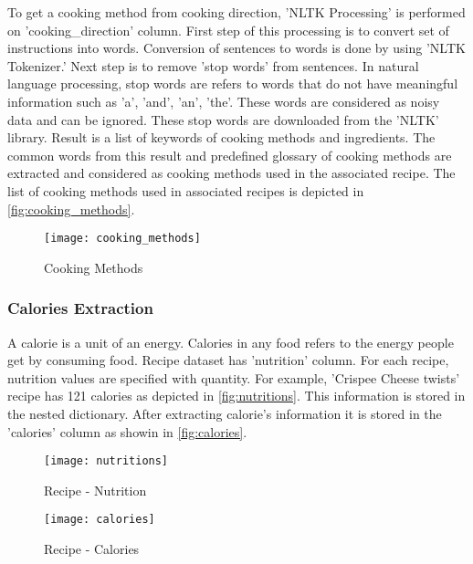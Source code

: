 \noindent To get a cooking method from cooking direction, 'NLTK Processing' is performed on 'cooking\_direction' column.  First step of this processing is to convert set of instructions into words. Conversion of sentences to words is done by using 'NLTK Tokenizer.' Next step is to remove 'stop words' from sentences. In natural language processing, stop words are refers to words that do not have meaningful information such as 'a', 'and', 'an', 'the'. These words are considered as noisy data and can be ignored. These stop words are downloaded from the 'NLTK' library. Result is a list of keywords of cooking methods and ingredients. The common words from this result and predefined glossary of cooking methods are extracted and considered as cooking methods used in the associated recipe. The list of cooking methods used in associated recipes is depicted in \autoref{fig:cooking_methods}.
\begin{figure}[H]
	\centering
	\texttt{[image: cooking\_methods]}
	\caption{Cooking Methods }
	\label{fig:cooking_methods}
\end{figure}  

\subsubsection{Calories Extraction}
A calorie is a unit of an energy. Calories in any food refers to the energy people get by consuming food. Recipe dataset has 'nutrition' column. For each recipe, nutrition values are specified with quantity. For example, 'Crispee Cheese twists' recipe has 121 calories as depicted in  \autoref{fig:nutritions}. This information is stored in the nested dictionary. After extracting calorie's information it is stored in the 'calories' column as showin in \autoref{fig:calories}.
\begin{figure}[H]
	\centering
	\texttt{[image: nutritions]}
	\caption{Recipe - Nutrition }
	\label{fig:nutritions}
\end{figure}  

\begin{figure}[H]
	\centering
	\texttt{[image: calories]}
	\caption{Recipe - Calories }
	\label{fig:calories}
\end{figure}  

